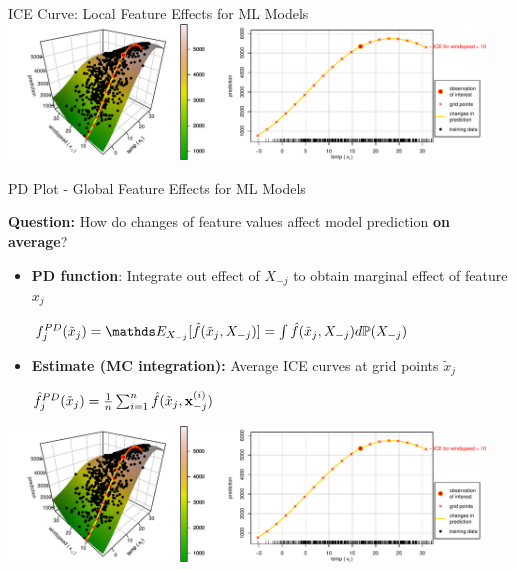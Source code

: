 \documentclass[11pt,compress,t,notes=noshow, aspectratio=169, xcolor=table,dvipsnames]{beamer}
\begin{document}
\begin{frame}{ICE Curve: Local Feature Effects for ML Models}
\vfill
\centering
\includegraphics[width=0.95\textwidth, page = 1]{figure/ice_motivation_bike}

\end{frame}



\begin{frame}{PD Plot - Global Feature Effects for ML Models}

\textbf{Question:} How do changes of feature values affect model prediction \textbf{on average}?


\begin{itemize}
    \item \textbf{PD function}: Integrate out effect of $X_{-j}$ to obtain marginal effect of feature $x_j$
    
    \medskip
    
    \centerline{$ \textstyle
    f_j^{PD}(\tilde x_j) = \E_{X_{-j}}[\hat f(\tilde x_j, X_{-j})] = \int \hat f(\tilde x_j, X_{-j}) d \mathbb{P}(X_{-j})
    $}

    \smallskip
    
    \item \textbf{Estimate (MC integration):} Average ICE curves at grid points $\tilde x_j$
    
    \medskip
    
    \centerline{$ \textstyle
    \hat f_j^{PD}(\tilde x_j) = \frac{1}{n} \sum_{i=1}^{n} \hat f(\tilde x_j, \xv_{-j}^{(i)})
    $}
\end{itemize}


\vfill
\centering
\includegraphics[width=0.95\textwidth, page = 2]{figure/ice_motivation_bike}

\end{frame}
\end{document}
